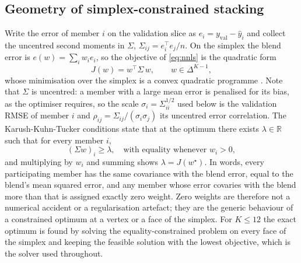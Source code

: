 \documentclass[journal]{IEEEtran}
\begin{document}
\subsection{Geometry of simplex-constrained stacking}
Write the error of member $i$ on the validation slice as $e_i = y_{\mathrm{val}} - \hat{y}_i$ and collect the uncentred second moments in $\Sigma$, $\Sigma_{ij} = e_i^{\top} e_j / n$. On the simplex the blend error is $e(w) = \sum_i w_i e_i$, so the objective of \eqref{eq:nnls} is the quadratic form
\begin{equation}
J(w) = w^{\top} \Sigma\, w, \qquad w \in \Delta^{K-1},
\label{eq:qp}
\end{equation}
whose minimisation over the simplex is a convex quadratic programme \cite{r21}. Note that $\Sigma$ is uncentred: a member with a large mean error is penalised for its bias, as the optimiser requires, so the scale $\sigma_i = \Sigma_{ii}^{1/2}$ used below is the validation RMSE of member $i$ and $\rho_{ij} = \Sigma_{ij}/(\sigma_i\sigma_j)$ its uncentred error correlation. The Karush-Kuhn-Tucker conditions state that at the optimum there exists $\lambda \in \mathbb{R}$ such that for every member $i$,
\begin{equation}
(\Sigma w)_i \geq \lambda, \quad \text{with equality whenever } w_i > 0,
\label{eq:kkt}
\end{equation}
and multiplying by $w_i$ and summing shows $\lambda = J(w^{\star})$. In words, every participating member has the same covariance with the blend error, equal to the blend's mean squared error, and any member whose error covaries with the blend more than that is assigned exactly zero weight. Zero weights are therefore not a numerical accident or a regularisation artefact; they are the generic behaviour of a constrained optimum at a vertex or a face of the simplex. For $K \le 12$ the exact optimum is found by solving the equality-constrained problem on every face of the simplex and keeping the feasible solution with the lowest objective, which is the solver used throughout.
\end{document}
